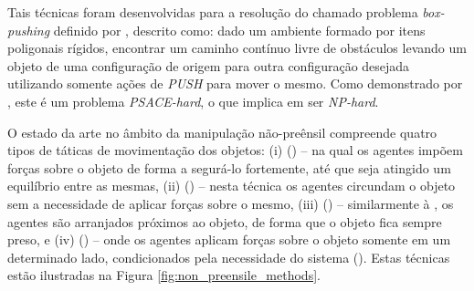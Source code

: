 Tais técnicas foram desenvolvidas para a resolução do chamado problema \emph{box-pushing} definido por \cite{Mataric1995}, descrito como: dado um ambiente formado por itens poligonais rígidos, encontrar um caminho contínuo livre de obstáculos levando um objeto de uma configuração de origem para outra configuração desejada utilizando somente ações de \emph{PUSH} para mover o mesmo. Como demonstrado por \cite{Reif1979}, este é um problema \emph{PSACE-hard}, o que implica em ser \emph{NP-hard}.

O estado da arte no âmbito da manipulação não-preênsil compreende quatro tipos de táticas de movimentação dos objetos:
(i)  () -- na qual os agentes impõem forças sobre o objeto de forma a segurá-lo fortemente, até que seja atingido um equilíbrio entre as mesmas,
(ii)  () -- nesta técnica os agentes circundam o objeto sem a necessidade de aplicar forças sobre o mesmo,
(iii)  () -- similarmente à , os agentes são arranjados próximos ao objeto, de forma que o objeto fica sempre preso, e
(iv)  () -- onde os agentes aplicam forças sobre o objeto somente em um determinado lado, condicionados pela necessidade do sistema (\cite{Eoh2011}). Estas técnicas estão ilustradas na Figura \ref{fig:non_preensile_methods}.

